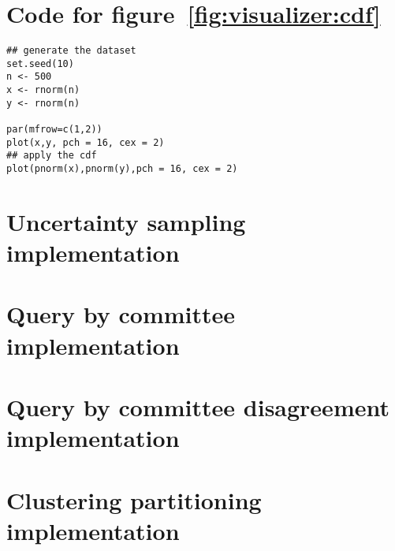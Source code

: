 \section{Code for figure~\ref{fig:visualizer:cdf}}
\label{sec:appendicies:cdf}
{
\begin{lstlisting}
## generate the dataset
set.seed(10)
n <- 500
x <- rnorm(n)
y <- rnorm(n)

par(mfrow=c(1,2))
plot(x,y, pch = 16, cex = 2)
## apply the cdf
plot(pnorm(x),pnorm(y),pch = 16, cex = 2)
\end{lstlisting}
}

\section{Uncertainty sampling implementation}
\label{sec:appendicies:al:uncertainty}

\section{Query by committee implementation}
\label{sec:appendicies:al:qbc}

\section{Query by committee disagreement implementation}
\label{sec:appendicies:al:qbcdisagree}

\section{Clustering partitioning implementation}
\label{sec:appendicies:al:clustering}

